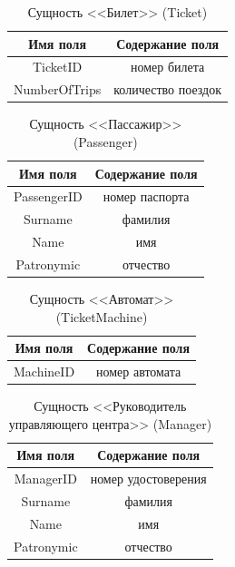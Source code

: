 \documentclass[a4paper,10pt]{article}
\theoremstyle{plain} %
\theoremstyle{definition} %
\theoremstyle{remark} %
\theoremstyle{definition}
\begin{document}
\begin{table}[h!]
\centering
\begin{tabular}{|c|c|}
\hline
    Имя поля & Содержание поля\\
    \hline
    TicketID & номер билета  \\
    NumberOfTrips & количество поездок  \\
    \hline
\end{tabular}
    \caption{Сущность <<Билет>> (Ticket)}
\end{table}


\begin{table}[h!]
\centering
\begin{tabular}{|c|c|}
\hline
    Имя поля & Содержание поля  \\
    \hline
    PassengerID & номер паспорта \\
    Surname & фамилия \\
    Name & имя \\
    Patronymic & отчество \\
    \hline
\end{tabular}
    \caption{Сущность <<Пассажир>> (Passenger)}
\end{table}

\begin{table}[h!]
\centering
\begin{tabular}{|c|c|}
\hline
    Имя поля &Содержание поля \\
    \hline
    MachineID & номер автомата \\
    \hline
\end{tabular}
    \caption{Сущность <<Автомат>> (TicketMachine)}
\end{table}

\begin{table}[h!]
\centering
\begin{tabular}{|c|c|}
\hline
    Имя поля & Содержание поля  \\
    \hline
    ManagerID & номер удостоверения\\
    Surname & фамилия \\
    Name & имя\\
    Patronymic & отчество \\
    \hline
\end{tabular}
    \caption{Сущность <<Руководитель управляющего центра>> (Manager)}
\end{table}
\end{document}
